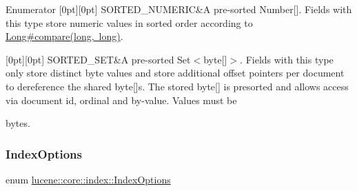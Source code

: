 \begin{DoxyEnumFields}{Enumerator}
[0pt][0pt]{}\mbox{\label{namespacelucene_1_1core_1_1index_a2f7ffaef6429b5df542c8aa12f8b9883a8dc1cbb371f983d43d5e233c1e162d77}} 
S\+O\+R\+T\+E\+D\+\_\+\+N\+U\+M\+E\+R\+IC&A pre-\/sorted Number\mbox{[}\mbox{]}. Fields with this type store numeric values in sorted order according to \mbox{\hyperlink{}{Long\#compare(long, long)}}. \\
\hline

[0pt][0pt]{}\mbox{\label{namespacelucene_1_1core_1_1index_a2f7ffaef6429b5df542c8aa12f8b9883a611320586b4623e36ed6224b139c0ce7}} 
S\+O\+R\+T\+E\+D\+\_\+\+S\+ET&A pre-\/sorted Set$<$byte\mbox{[}\mbox{]}$>$. Fields with this type only store distinct byte values and store additional offset pointers per document to dereference the shared byte\mbox{[}\mbox{]}s. The stored byte\mbox{[}\mbox{]} is presorted and allows access via document id, ordinal and by-\/value. Values must be 
\begin{DoxyCode}
\newline
\end{DoxyCode}
 bytes. \\
\hline

\end{DoxyEnumFields}
\mbox{\label{namespacelucene_1_1core_1_1index_a0d5e1f98471a76de106056cf3b5a7897}} 
\subsubsection{\texorpdfstring{Index\+Options}{IndexOptions}}
{\footnotesize\ttfamily enum \mbox{\hyperlink{namespacelucene_1_1core_1_1index_a0d5e1f98471a76de106056cf3b5a7897}{lucene\+::core\+::index\+::\+Index\+Options}}\hspace{0.3cm}{\ttfamily [strong]}}

